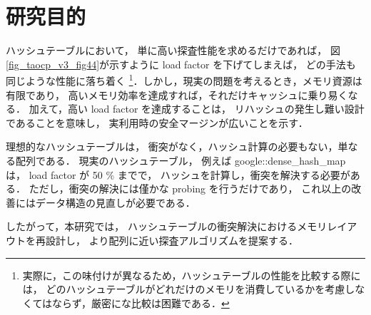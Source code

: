 \section{研究目的}
ハッシュテーブルにおいて，
単に高い探査性能を求めるだけであれば，
図\ref{fig_taocp_v3_fig44}が示すように load factor を下げてしまえば，
どの手法も同じような性能に落ち着く
\footnote{
  実際に，この味付けが異なるため，ハッシュテーブルの性能を比較する際には，
  どのハッシュテーブルがどれだけのメモリを消費しているかを考慮しなくてはならず，厳密にな比較は困難である．
}．しかし，現実の問題を考えるとき，メモリ資源は有限であり，
高いメモリ効率を達成すれば，それだけキャッシュに乗り易くなる．
加えて，高い load factor を達成することは，
リハッシュの発生し難い設計であることを意味し，
実利用時の安全マージンが広いことを示す．

理想的なハッシュテーブルは，
衝突がなく，ハッシュ計算の必要もない，単なる配列である．
現実のハッシュテーブル，
例えば google::dense\_hash\_map は，
load factor が 50 \% までで，
ハッシュを計算し，衝突を解決する必要がある．
ただし，衝突の解決には僅かな probing を行うだけであり，
これ以上の改善にはデータ構造の見直しが必要である．

したがって，本研究では，
ハッシュテーブルの衝突解決におけるメモリレイアウトを再設計し，
より配列に近い探査アルゴリズムを提案する．

